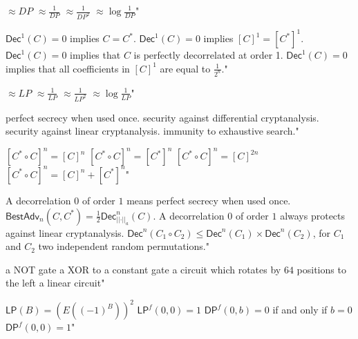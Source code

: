 {$\approx DP$}
{$\approx \frac{1}{DP}$}
{$\approx \frac{1}{DP^2}$}
{$\approx \log \frac{1}{DP}$"}

{$\mathsf{Dec}^1(C)=0$ implies $C=C^*$.}
{$\mathsf{Dec}^1(C)=0$ implies $[C]^1=[C^*]^1$.}
{$\mathsf{Dec}^1(C)=0$ implies that $C$ is perfectly decorrelated at order 1.}
{$\mathsf{Dec}^1(C)=0$ implies that all coefficients in $[C]^1$ are equal to $\frac{1}{2^n}$."}

{$\approx LP$}
{$\approx \frac{1}{LP}$}
{$\approx \frac{1}{LP^2}$}
{$\approx \log \frac{1}{LP}$"}

{perfect secrecy when used once.}
{security against differential cryptanalysis.}
{security against linear cryptanalysis.}
{immunity to exhaustive search."}

{$[C^* \circ C]^n = [C]^n$}
{$[C^* \circ C]^n = [C^*]^n$}
{$[C^* \circ C]^n = [C]^{2n}$}
{$[C^* \circ C]^n = [C]^n + [C^*]^n$"}

{A decorrelation $0$ of order $1$ means perfect secrecy when used once.}
{$\mathsf{BestAdv}_n(C,C^\ast)=\frac{1}{2}\mathsf{Dec}^n_{\left|\left|\cdot\right|\right|_a}(C)$.}
{A decorrelation $0$ of order $1$ always protects against linear cryptanalysis.}
{$\mathsf{Dec}^n(C_1\circ C_2) \leq \mathsf{Dec}^n(C_1) \times \mathsf{Dec}^n(C_2)$, for $C_1$ and $C_2$ two independent random permutations."}

{a NOT gate}
{a XOR to a constant gate}
{a circuit which rotates by $64$ positions to the left}
{a linear circuit"}

{$\mathsf{LP}(B) = (E((-1)^B))^2$}
{$\mathsf{LP}^f(0,0)=1$}
{$\mathsf{DP}^f(0,b) = 0$ if and only if $b=0$}
{$\mathsf{DP}^f(0,0)=1$"}

